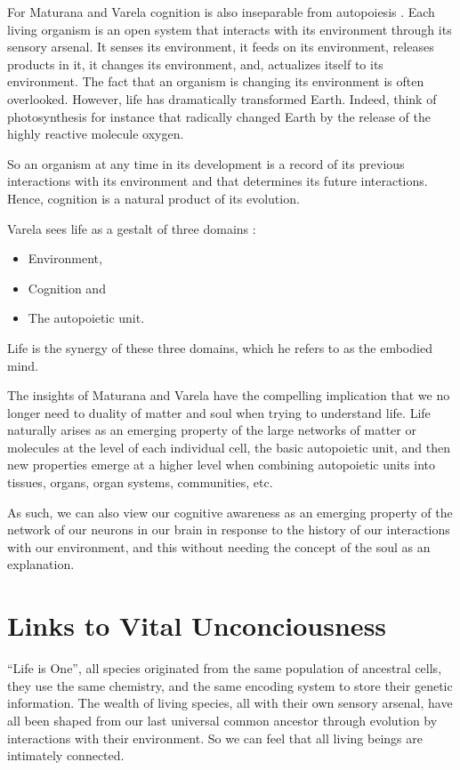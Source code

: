 \documentclass[
  11pt,
]{book}
\providecommand{\tightlist}{%
  \setlength{\itemsep}{0pt}\setlength{\parskip}{0pt}}
\begin{document}
For Maturana and Varela cognition is also inseparable from autopoiesis \citep{capraLuisi2014}. Each living organism is an open system that interacts with its environment through its sensory arsenal. It senses its environment, it feeds on its environment, releases products in it, it changes its environment, and, actualizes itself to its environment. The fact that an organism is changing its environment is often overlooked. However, life has dramatically transformed Earth. Indeed, think of photosynthesis for instance that radically changed Earth by the release of the highly reactive molecule oxygen.

So an organism at any time in its development is a record of its previous interactions with its environment and that determines its future interactions.
Hence, cognition is a natural product of its evolution.

Varela sees life as a gestalt of three domains \citep{capraLuisi2014}:

\begin{itemize}
\tightlist
\item
  Environment,
\item
  Cognition and
\item
  The autopoietic unit.
\end{itemize}

Life is the synergy of these three domains, which he refers to as the embodied mind.

The insights of Maturana and Varela have the compelling implication that we no longer need to duality of matter and soul when trying to understand life. Life naturally arises as an emerging property of the large networks of matter or molecules at the level of each individual cell, the basic autopoietic unit, and then new properties emerge at a higher level when combining autopoietic units into tissues, organs, organ systems, communities, etc.

As such, we can also view our cognitive awareness as an emerging property of the network of our neurons in our brain in response to the history of our interactions with our environment, and this without needing the concept of the soul as an explanation.

\hypertarget{links-to-vital-unconciousness}{%
\section{Links to Vital Unconciousness}\label{links-to-vital-unconciousness}}

``Life is One'', all species originated from the same population of ancestral cells, they use the same chemistry, and the same encoding system to store their genetic information.
The wealth of living species, all with their own sensory arsenal, have all been shaped from our last universal common ancestor through evolution by interactions with their environment.
So we can feel that all living beings are intimately connected.
\end{document}
